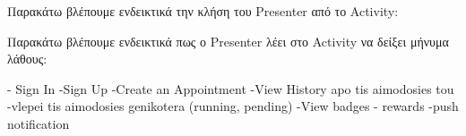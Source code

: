    		Παρακάτω βλέπουμε ενδεικτικά την κλήση του Presenter από το Activity:
   		
		
		Παρακάτω βλέπουμε ενδεικτικά πως ο Presenter λέει στο Activity να δείξει μήνυμα λάθους:
		



	- Sign In
	 -Sign Up
	 -Create an Appointment
	 -View History apo tis aimodosies tou
	 -vlepei tis aimodosies genikotera (running, pending)
	 -View badges - rewards
	 -push notification
	
		

%		
